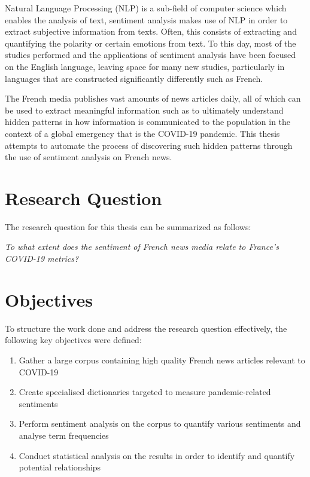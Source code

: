 Natural Language Processing (NLP) is a sub-field of computer science which enables the analysis of text, sentiment analysis makes use of NLP in order to extract subjective information from texts. Often, this consists of extracting and quantifying the polarity or certain emotions from text.
To this day, most of the studies performed and the applications of sentiment analysis have been focused on the English language, leaving space for many new studies, particularly in languages that are constructed significantly differently such as French.

The French media publishes vast amounts of news articles daily, all of which can be used to extract meaningful information such as to ultimately understand hidden patterns in how information is communicated to the population in the context of a global emergency that is the COVID-19 pandemic.
This thesis attempts to automate the process of discovering such hidden patterns through the use of sentiment analysis on French news.

\section{Research Question}\label{chap: Research Question}

The research question for this thesis can be summarized as follows:

\begin{center}
    \emph{To what extent does the sentiment of French news media relate to France's COVID-19 metrics?}
\end{center}

\section{Objectives}\label{chap: Research Objectives}
To structure the work done and address the research question effectively, the following key objectives were defined:
\begin{enumerate}
    \item Gather a large corpus containing high quality French news articles relevant to COVID-19
    \item Create specialised dictionaries targeted to measure pandemic-related sentiments
    \item Perform sentiment analysis on the corpus to quantify various sentiments and analyse term frequencies
    \item Conduct statistical analysis on the results in order to identify and quantify potential relationships
\end{enumerate}

